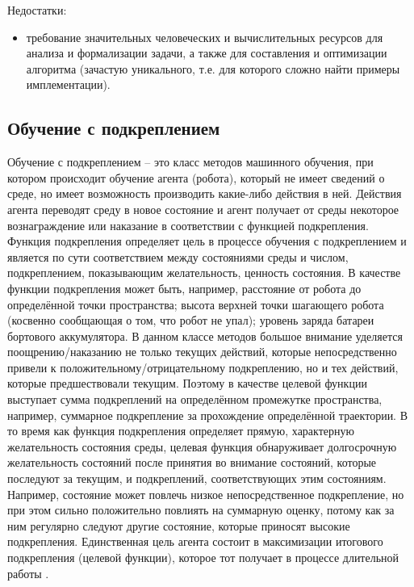 Недостатки:
\begin{itemize}
	\item требование значительных человеческих и вычислительных ресурсов для анализа и формализации задачи, 
а также для составления и оптимизации алгоритма (зачастую уникального, т.е. для которого сложно найти примеры имплементации).
\end{itemize}


\subsection{Обучение с подкреплением}

Обучение с подкреплением -- это класс методов машинного обучения, при котором происходит обучение агента (робота), который не имеет сведений о среде, но имеет возможность производить какие-либо действия в ней. 
Действия агента переводят среду в новое состояние и агент получает от среды некоторое вознаграждение или наказание в соответствии с функцией подкрепления. 
Функция подкрепления определяет цель в процессе обучения с подкреплением и является по сути соответствием между состояниями среды и числом, подкреплением, показывающим желательность, ценность состояния. В качестве функции подкрепления может быть, например, расстояние от робота до определённой точки пространства; высота верхней точки шагающего робота (косвенно сообщающая о том, что робот не упал); уровень заряда батареи бортового аккумулятора.
В данном классе методов большое внимание уделяется поощрению/наказанию не только текущих действий, которые непосредственно привели к положительному/отрицательному подкреплению, но и тех действий, которые предшествовали текущим.
Поэтому в качестве целевой функции выступает сумма подкреплений на определённом промежутке пространства, например, суммарное подкрепление за прохождение определённой траектории.
В то время как функция подкрепления определяет прямую, характерную желательность состояния среды, целевая функция обнаруживает долгосрочную желательность состояний после принятия во внимание состояний, которые последуют за текущим, и подкреплений, соответствующих этим состояниям. 
Например, состояние может повлечь низкое непосредственное подкрепление, но при этом сильно положительно повлиять на суммарную оценку, потому как за ним регулярно следуют другие состояние, которые приносят высокие подкрепления. 
Единственная цель агента состоит в максимизации итогового подкрепления (целевой функции), которое тот получает в процессе длительной работы \cite{reinf_lern}.  

